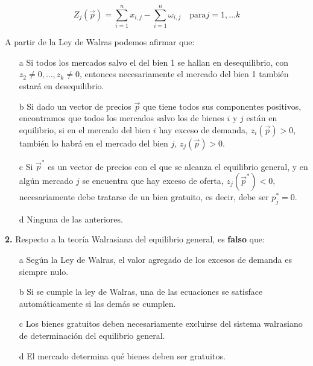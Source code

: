 \documentclass{nuevotema}
\begin{document}
\begin{equation*}
Z_j (\vec{p}) = \sum_{i=1}^n x_{i,j} - \sum_{i=1}^n \omega_{i,j} \quad \text{para} j=1,\ldots k
\end{equation*}

A partir de la Ley de Walras podemos afirmar que:

\begin{itemize}
	\item[a] Si todos los mercados salvo el del bien 1 se hallan en desequilibrio, con $z_2 \neq 0, \ldots, z_k \neq 0$, entonces necesariamente el mercado del bien 1 también estará en desequilibrio.
	\item[b] Si dado un vector de precios $\vec{p}$ que tiene todos sus componentes positivos, encontramos que todos los mercados salvo los de bienes $i$ y $j$ están en equilibrio, si en el mercado del bien $i$ hay exceso de demanda, $z_i(\vec{p}) >0$, también lo habrá en el mercado del bien $j$, $z_j(\vec{p}) > 0$.
	\item[c] Si $\vec{p}^*$ es un vector de precios con el que se alcanza el equilibrio general, y en algún mercado $j$ se encuentra que hay exceso de oferta, $z_j (\vec{p}^*) < 0$, necesariamente debe tratarse de un bien gratuito, es decir, debe ser $p_j^*= 0$.
	\item[d] Ninguna de las anteriores.
\end{itemize}

\textbf{2.} Respecto a la teoría Walrasiana del equilibrio general, es \textbf{falso} que:
\begin{itemize}
	\item[a] Según la Ley de Walras, el valor agregado de los excesos de demanda es siempre nulo.
	\item[b] Si se cumple la ley de Walras, una de las ecuaciones se satisface automáticamente si las demás se cumplen.
	\item[c] Los bienes gratuitos deben necesariamente excluirse del sistema walrasiano de determinación del equilibrio general.
	\item[d] El mercado determina qué bienes deben ser gratuitos.
\end{itemize}
\end{document}
